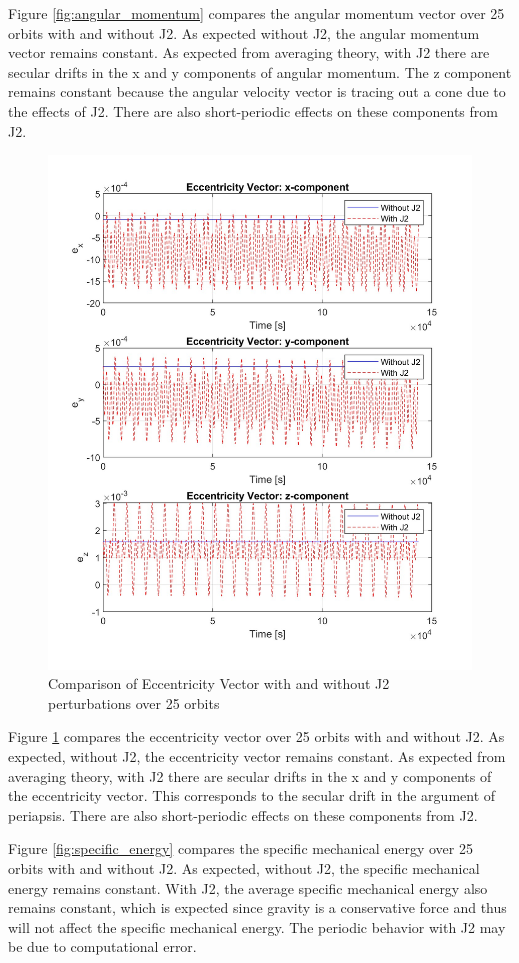 Figure \ref{fig:angular_momentum} compares the angular momentum vector over 25 orbits with and without J2. As expected without J2, the angular momentum vector remains constant. As expected from averaging theory, with J2 there are secular drifts in the x and y components of angular momentum. The z component remains constant because the angular velocity vector is tracing out a cone due to the effects of J2. There are also short-periodic effects on these components from J2.  

\begin{figure}[H]
    \centering
    \includegraphics[width=0.5\linewidth]{PS1/Figures/ecc_J2_comparison.jpg}
    \caption{Comparison of Eccentricity Vector with and without J2 perturbations over 25 orbits}
    \label{fig:eccentricity_vector}
\end{figure}

Figure \ref{fig:eccentricity_vector} compares the eccentricity vector over 25 orbits with and without J2. As expected, without J2, the eccentricity vector remains constant. As expected from averaging theory, with J2 there are secular drifts in the x and y components of the eccentricity vector. This corresponds to the secular drift in the argument of periapsis. There are also short-periodic effects on these components from J2.  


Figure \ref{fig:specific_energy} compares the specific mechanical energy over 25 orbits with and without J2. As expected, without J2, the specific mechanical energy remains constant. With J2, the average specific mechanical energy also remains constant, which is expected since gravity is a conservative force and thus will not affect the specific mechanical energy. The periodic behavior with J2 may be due to computational error. 


